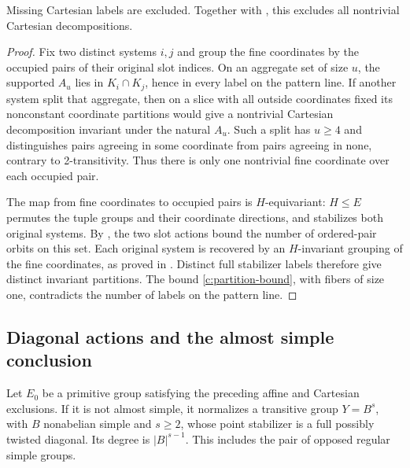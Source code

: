 \begin{proposition}\label{c:cartesian-pruning}
Missing Cartesian labels are excluded. Together with , this excludes all nontrivial Cartesian decompositions.
\end{proposition}

\begin{proof}
Fix two distinct systems $i,j$ and group the fine coordinates by the
occupied pairs of their original slot indices. On an aggregate set of
size $u$, the supported $A_u$ lies in $K_i\cap K_j$, hence in every
label on the pattern line. If another system split that aggregate,
then on a slice with all outside coordinates fixed its nonconstant
coordinate partitions would give a nontrivial Cartesian decomposition
invariant under the natural $A_u$. Such a split has $u\ge4$ and
distinguishes pairs agreeing in some coordinate from pairs agreeing
in none, contrary to 2-transitivity. Thus there is only one nontrivial
fine coordinate over each occupied pair.

The map from fine coordinates to occupied pairs is $H$-equivariant:
$H\le E$ permutes the tuple groups and their coordinate directions,
and stabilizes both original systems. By
, the two slot actions bound the number of
ordered-pair orbits on this set. Each original system is recovered
by an $H$-invariant grouping of the fine coordinates, as proved in
. Distinct full stabilizer labels therefore
give distinct invariant partitions. The bound
\eqref{c:partition-bound}, with fibers of size one, contradicts the
number of labels on the pattern line.
\end{proof}

\subsection{Diagonal actions and the almost simple conclusion}

\begin{lemma}\label{c:primitive-diagonal}
Let \(E_0\) be a primitive group satisfying the preceding affine and Cartesian exclusions. If it is not almost simple, it normalizes a transitive group \(Y=B^s\), with \(B\) nonabelian simple and \(s\ge2\), whose point stabilizer is a full possibly twisted diagonal. Its degree is \(|B|^{s-1}\). This includes the pair of opposed regular simple groups.
\end{lemma}

